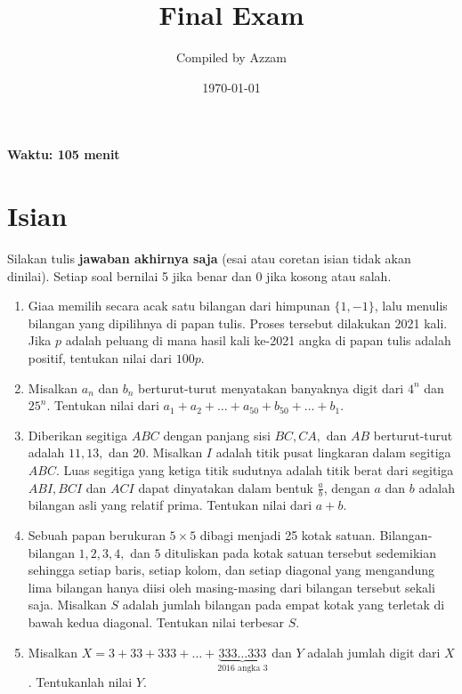 \documentclass[12pt]{scrartcl}
\title{Final Exam}
\author{Compiled by Azzam}
\date{\today}
\begin{document}
\maketitle

\renewcommand*\contentsname{Daftar Isi}
\tableofcontents

\newpage
\textbf{Waktu: 105 menit}

\section{Isian}
Silakan tulis \textbf{jawaban akhirnya saja} (esai atau coretan isian tidak akan dinilai). Setiap soal bernilai 5 jika benar dan 0 jika kosong atau salah.
\begin{enumerate}[resume]
    \item Giaa memilih secara acak satu bilangan dari himpunan $\{1,-1\}$, lalu menulis bilangan yang dipilihnya di papan tulis. Proses tersebut dilakukan 2021 kali. Jika $p$ adalah peluang di mana hasil kali ke-2021 angka di papan tulis adalah positif, tentukan nilai dari $100p$.
	
	
    \item Misalkan $a_n$ dan $b_n$ berturut-turut menyatakan banyaknya digit dari $4^n$ dan $25^n$. Tentukan nilai dari $a_1+a_2+\dots +a_{50}+b_{50}+\dots+b_1$.
	
	
    \item Diberikan segitiga $ABC$ dengan panjang sisi $BC,CA,$ dan $AB$ berturut-turut adalah $11,13,$ dan $20$. Misalkan $I$ adalah titik pusat lingkaran dalam segitiga $ABC$. Luas segitiga yang ketiga titik sudutnya adalah titik berat dari segitiga $ABI,BCI$ dan $ACI$ dapat dinyatakan dalam bentuk $\frac{a}{b}$, dengan $a$ dan $b$ adalah bilangan asli yang relatif prima. Tentukan nilai dari $a+b$.
	
    \item Sebuah papan berukuran $5 \times 5$ dibagi menjadi 25 kotak satuan. Bilangan-bilangan $1,2,3,4,$ dan $5$ dituliskan pada kotak satuan tersebut sedemikian sehingga setiap baris, setiap kolom, dan setiap diagonal yang mengandung lima bilangan hanya diisi oleh masing-masing dari bilangan tersebut sekali saja. Misalkan $S$ adalah jumlah bilangan pada empat kotak yang terletak di bawah kedua diagonal. Tentukan nilai terbesar $S$.
	
    \item Misalkan $X = 3 + 33 + 333 + \dots + \underbrace{333 \dots 333}_{2016 \text{ angka } 3}$ dan $Y$ adalah jumlah digit dari $X$. Tentukanlah nilai $Y$.
	
\end{enumerate}
\end{document}
